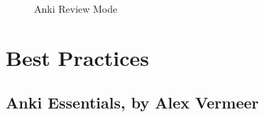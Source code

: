 \documentclass[]{tufte-handout}
\begin{document}
\begin{itemize}
\begin{itemize}
\begin{figure}
  \hspace{1cm}
  \hspace{1cm}
  \caption{Anki Review Mode}
  \label{fig:review}
\end{figure}

	\end{itemize}
\end{itemize}




\section{Best Practices}


\subsection{Anki Essentials, by Alex Vermeer}
\end{document}
